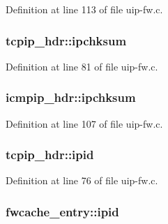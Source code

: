 Definition at line 113 of file uip-\/fw.c.

\hypertarget{group__uipfw_gac9d7e009428b082b42289b22bc297085}{
\subsubsection[{ipchksum}]{ {\bf tcpip\_\-hdr::ipchksum}}}
\label{group__uipfw_gac9d7e009428b082b42289b22bc297085}


Definition at line 81 of file uip-\/fw.c.

\hypertarget{group__uipfw_ga937e9a7c3241a3db558d51ade5d5336d}{
\subsubsection[{ipchksum}]{ {\bf icmpip\_\-hdr::ipchksum}}}
\label{group__uipfw_ga937e9a7c3241a3db558d51ade5d5336d}


Definition at line 107 of file uip-\/fw.c.

\hypertarget{group__uipfw_ga64fde6733614e762febfa222d41997a5}{
\subsubsection[{ipid}]{ {\bf tcpip\_\-hdr::ipid}}}
\label{group__uipfw_ga64fde6733614e762febfa222d41997a5}


Definition at line 76 of file uip-\/fw.c.

\hypertarget{group__uipfw_ga870c863f3b770fb2ec8affdd01277326}{
\subsubsection[{ipid}]{ {\bf fwcache\_\-entry::ipid}}}
\label{group__uipfw_ga870c863f3b770fb2ec8affdd01277326}


